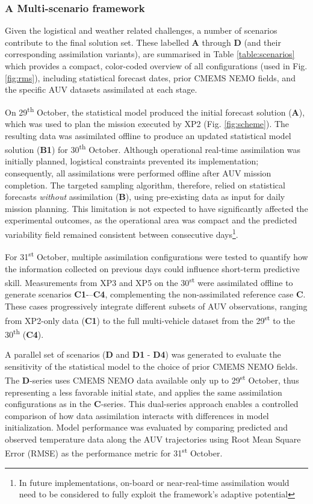 \subsubsection{A Multi-scenario framework}

Given the logistical and weather related challenges, a number of
scenarios contribute to the final solution set. These labelled
\textbf{A} through \textbf{D} (and their corresponding assimilation
variants), are summarised in Table \ref{table:scenarios} which
provides a compact, color-coded overview of all configurations (used
in Fig. \ref{fig:rms}), including statistical forecast dates,
prior CMEMS NEMO fields, and the specific AUV datasets
assimilated at each stage.

On 29\textsuperscript{th} October, the statistical model produced the
initial forecast solution (\textbf{A}), which was used to plan the
mission executed by XP2 (Fig. \ref{fig:scheme}). The resulting data
was assimilated offline to produce an updated statistical model
solution (\textbf{B1}) for 30\textsuperscript{th} October. Although
operational real-time assimilation was initially planned, logistical
constraints prevented its implementation; consequently, all
assimilations were performed offline after AUV mission completion. The
targeted sampling algorithm, therefore, relied on statistical
forecasts \emph{without} assimilation (\textbf{B}), using pre-existing
data as input for daily mission planning. This limitation is not
expected to have significantly affected the experimental outcomes, as
the operational area was compact and the predicted variability field
remained consistent between consecutive days\footnote{In future
  implementations, on-board or near-real-time assimilation would need
  to be considered to fully exploit the framework's adaptive
  potential}.

For 31\textsuperscript{st} October, multiple assimilation
configurations were tested to quantify how the information collected
on previous days could influence short-term predictive
skill. Measurements from XP3 and XP5 on the 30\textsuperscript{st}
were assimilated offline to generate scenarios
\textbf{C1}-–\textbf{C4}, complementing the non-assimilated reference
case \textbf{C}. These cases progressively integrate different subsets
of AUV observations, ranging from XP2-only data (\textbf{C1}) to the
full multi-vehicle dataset from the 29\textsuperscript{st} to the
30\textsuperscript{th} (\textbf{C4}).

A parallel set of scenarios (\textbf{D} and \textbf{D1} - \textbf{D4})
was generated to evaluate the sensitivity of the statistical model to
the choice of prior CMEMS NEMO fields. The \textbf{D}-series
uses CMEMS NEMO data available only up to
29\textsuperscript{st} October, thus representing a less favorable
initial state, and applies the same assimilation configurations as in
the \textbf{C}-series. This dual-series approach enables a controlled
comparison of how data assimilation interacts with differences in
model initialization.  Model performance was evaluated by comparing
predicted and observed temperature data along the AUV trajectories
using Root Mean Square Error (RMSE) as the performance metric for
31\textsuperscript{st} October.

